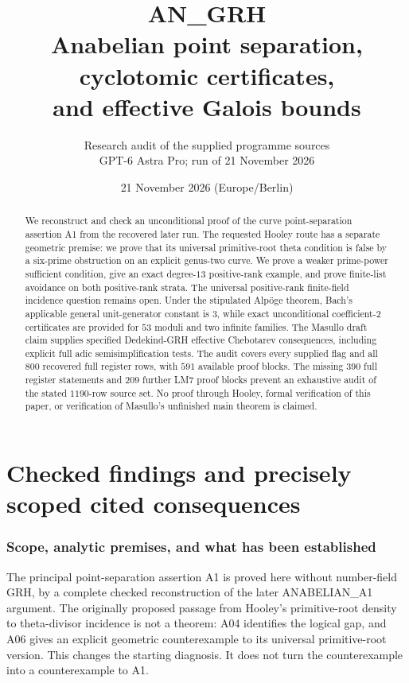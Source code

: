 \documentclass[11pt,a4paper]{article}
\title{\textbf{AN\_GRH}\\[7pt]Anabelian point separation, cyclotomic certificates,\\and effective Galois bounds}
\author{Research audit of the supplied programme sources\\GPT-6 Astra Pro; run of 21 November 2026}
\date{21 November 2026 (Europe/Berlin)}
\begin{document}
\maketitle
\begin{abstract}
We reconstruct and check an unconditional proof of the curve point-separation
assertion A1 from the recovered later run. The requested Hooley route has a
separate geometric premise: we prove that its universal primitive-root theta
condition is false by a six-prime obstruction on an explicit genus-two curve.
We prove a weaker prime-power sufficient condition, give an exact degree-$13$
positive-rank example, and prove finite-list avoidance on both positive-rank
strata. The universal positive-rank finite-field incidence question remains open.
Under the stipulated Alp\"oge theorem, Bach's applicable general unit-generator
constant is $3$, while exact unconditional coefficient-$2$ certificates are
provided for $53$ moduli and two infinite families. The Masullo draft claim
supplies specified Dedekind-GRH effective Chebotarev consequences, including
explicit full adic semisimplification tests. The audit covers every supplied
flag and all $800$ recovered full register rows, with $591$ available proof
blocks. The missing $390$ full register statements and $209$ further LM7
proof blocks prevent an exhaustive audit of the stated $1190$-row source set.
No proof through Hooley, formal verification of this paper, or verification
of Masullo's unfinished main theorem is claimed.
\end{abstract}
\tableofcontents
\clearpage
\part{Checked findings and precisely scoped cited consequences}
\section{Scope, analytic premises, and what has been established}
\label{sec:premises}

The principal point-separation assertion A1 is proved here without
number-field GRH, by a complete checked reconstruction of the later
ANABELIAN\_A1 argument. The originally proposed passage from Hooley's
primitive-root density to theta-divisor incidence is not a theorem:
A04 identifies the logical gap, and A06 gives an explicit geometric
counterexample to its universal primitive-root version. This changes
the starting diagnosis. It does not turn the counterexample into a
counterexample to A1.
\end{document}
